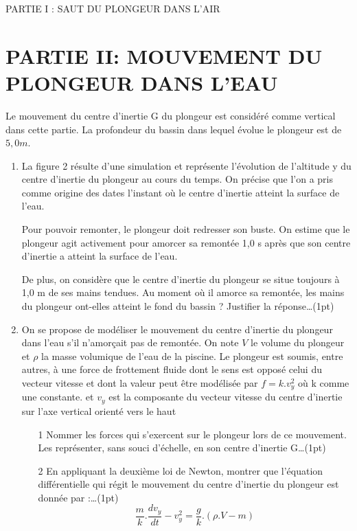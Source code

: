 \documentclass[12pt]{article}
\begin{document}
\begin{Box2}{PARTIE I : SAUT DU PLONGEUR DANS L’AIR }
\section*{PARTIE II: MOUVEMENT DU PLONGEUR DANS L’EAU}
Le mouvement du centre d’inertie G du plongeur est considéré comme vertical dans cette partie. La profondeur du bassin dans lequel évolue le plongeur est de $5,0 m$.

	\begin{enumerate}
		\item La figure 2 résulte d’une simulation et représente l’évolution de l’altitude y du centre d’inertie du plongeur
au cours du temps.
On précise que l’on a pris comme origine des dates l’instant où le centre d’inertie atteint la surface de
l’eau.

      Pour pouvoir remonter, le plongeur doit redresser son buste.
On estime que le plongeur agit activement pour amorcer sa remontée 1,0 s après que son centre d’inertie
a atteint la surface de l’eau.

      De plus, on considère que le centre d’inertie du plongeur se situe toujours à 1,0 m de ses mains tendues.
Au moment où il amorce sa remontée, les mains du plongeur ont-elles atteint le fond du bassin ? Justifier
      la réponse\dots(1pt)
    \item On se propose de modéliser le mouvement du centre d’inertie du plongeur dans l’eau s’il n’amorçait pas
de remontée.
On note $V$ le volume du plongeur et $\rho$ la masse volumique de l’eau de la piscine.
Le plongeur est soumis, entre autres, à une force de frottement fluide dont le sens est opposé celui du
vecteur vitesse et dont la valeur peut être modélisée par $f = k.v^2_y$ où k comme une constante. et $v_y$ est la
composante du vecteur vitesse du centre d’inertie sur l’axe vertical orienté vers le haut
\begin{enumerate}
  \item[1]  Nommer les forces qui s’exercent sur le plongeur lors de ce mouvement. Les
    représenter, sans souci d’échelle, en son centre d’inertie G\dots(1pt)

  \item[2] En appliquant la deuxième loi de Newton, montrer que l’équation différentielle
    qui régit le mouvement du centre d’inertie du plongeur est donnée par :\dots(1pt)
    $$\frac{m}{k}.\frac{dv_y}{dt} - v^2_y = \frac{g}{k}.(\rho.V - m)$$


\end{enumerate}
\end{enumerate}
\end{Box2}
\end{document}
